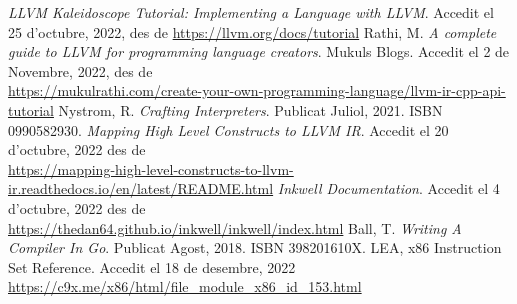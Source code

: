﻿\documentclass{article}
\begin{document}
\newpage
\renewcommand\refname{Bibliografia}
\begin{thebibliography}{9}

 \textit{LLVM Kaleidoscope Tutorial: Implementing a Language with LLVM}. Accedit el 25 d'octubre, 2022, des de \url{https://llvm.org/docs/tutorial}
 Rathi, M. \textit{A complete guide to LLVM for programming language creators}. Mukuls Blogs. Accedit el 2 de Novembre, 2022, des de \\\url{https://mukulrathi.com/create-your-own-programming-language/llvm-ir-cpp-api-tutorial}
 Nystrom, R. \textit{Crafting Interpreters}. Publicat Juliol, 2021. ISBN 0990582930.
 \textit{Mapping High Level Constructs to LLVM IR}. Accedit el 20 d'octubre, 2022 des de \\\url{https://mapping-high-level-constructs-to-llvm-ir.readthedocs.io/en/latest/README.html}
 \textit{Inkwell Documentation}. Accedit el 4 d'octubre, 2022 des de \\\url{https://thedan64.github.io/inkwell/inkwell/index.html}
 Ball, T. \textit{Writing A Compiler In Go}. Publicat Agost, 2018. ISBN 398201610X.
 LEA, x86 Instruction Set Reference. Accedit el 18 de desembre, 2022 \\\url{https://c9x.me/x86/html/file_module_x86_id_153.html}

\end{thebibliography}
\end{document}
